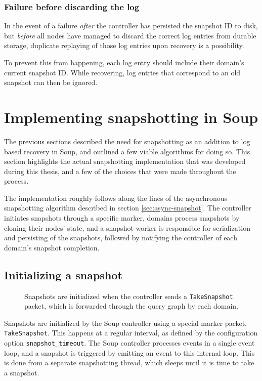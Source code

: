 \documentclass[b5paper]{report}
\begin{document}
\subsubsection{Failure before discarding the log}
In the event of a failure \textit{after} the controller has persisted the
snapshot ID to disk, but \textit{before} all nodes have managed to discard the
correct log entries from durable storage, duplicate replaying of those log
entries upon recovery is a possibility.

To prevent this from happening, each log entry should include their domain's
current snapshot ID. While recovering, log entries that correspond to an old
snapshot can then be ignored.

\section{Implementing snapshotting in Soup}
The previous sections described the need for snapshotting as an addition to log
based recovery in Soup, and outlined a few viable algorithms for doing so. This
section highlights the actual snapshotting implementation that was developed
during this thesis, and a few of the choices that were made throughout the
process.

The implementation roughly follows along the lines of the asynchronous
snapshotting algorithm described in section \ref{sec:async-snapshot}. The
controller initiates snapshots through a specific marker, domains process
snapshots by cloning their nodes' state, and a snapshot worker is responsible
for serialization and persisting of the snapshots, followed by notifying the
controller of each domain's snapshot completion.

\subsection{Initializing a snapshot} \label{sec:snapshot-init}
\begin{figure}[H]
  \begin{center}
    
    \caption{
      Snapshots are initialized when the controller sends a
      \texttt{TakeSnapshot} packet, which is forwarded through the query graph
      by each domain. \label{fig:take-snapshot}
    }
  \end{center}
\end{figure}

Snapshots are initialized by the Soup controller using a special marker packet,
\texttt{TakeSnapshot}. This happens at a regular interval, as defined by the
configuration option \texttt{snapshot\_timeout}. The Soup controller processes
events in a single event loop, and a snapshot is triggered by emitting an
event to this internal loop. This is done from a separate snapshotting thread,
which sleeps until it is time to take a snapshot.
\end{document}
